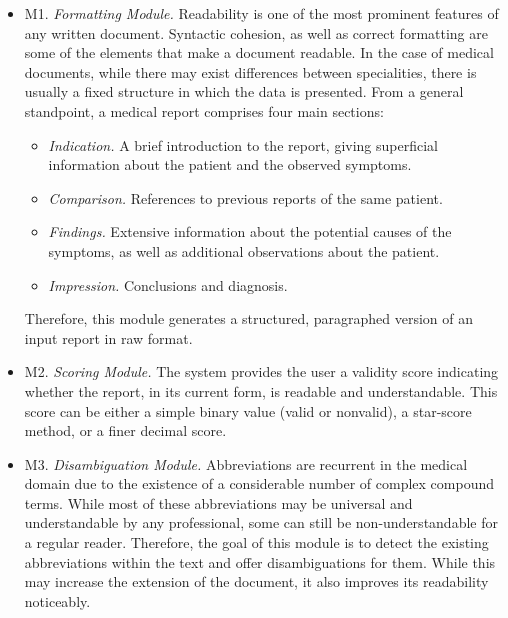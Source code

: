 \begin{itemize}
    \item M1. \textit{Formatting Module.} Readability is one of the most prominent features of any written document. Syntactic cohesion, as well as correct formatting are some of the elements that make a document readable. In the case of medical documents, while there may exist differences between specialities, there is usually a fixed structure in which the data is presented. From a general standpoint, a medical report comprises four main sections:
    \begin{itemize}
        \item \textit{Indication.} A brief introduction to the report, giving superficial information about the patient and the observed symptoms.
        \item \textit{Comparison.} References to previous reports of the same patient.
        \item \textit{Findings.} Extensive information about the potential causes of the symptoms, as well as additional observations about the patient.
        \item \textit{Impression.} Conclusions and diagnosis.
    \end{itemize}
    Therefore, this module generates a structured, paragraphed version of an input report in raw format.
    
    \item M2. \textit{Scoring Module.} The system provides the user a validity score indicating whether the report, in its current form, is readable and understandable. This score can be either a simple binary value (valid or nonvalid), a star-score method, or a finer decimal score.
    
    \item M3. \textit{Disambiguation Module.} Abbreviations are recurrent in the medical domain due to the existence of a considerable number of complex compound terms. While most of these abbreviations may be universal and understandable by any professional, some can still be non-understandable for a regular reader. Therefore, the goal of this module is to detect the existing abbreviations within the text and offer disambiguations for them. While this may increase the extension of the document, it also improves its readability noticeably.
    

\end{itemize}
